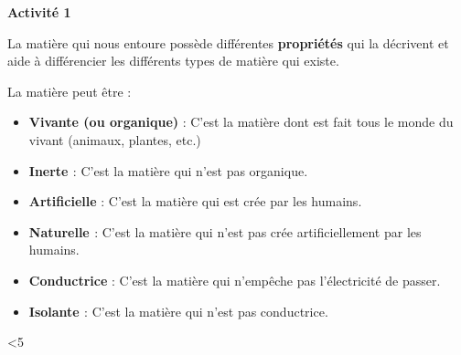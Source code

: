 \documentclass[10pt]{article}
\newcommand{\titre}{Activité 1} %
\newcommand{\sep}{-4pt} %
\newcommand{\DoItNTimes}{5} %
\begin{document}
\thispagestyle{fancy}
\cfoot{}


\setcounter{int}{1}
\loop

\begin{mybox}{\textbf{\titre}}    
    \setlength\parindent{4pt} %
    \setlength\parskip{5pt} 

	La matière qui nous entoure possède différentes \textbf{\color{DarkRed} {propriétés}} 
    qui la décrivent et aide à différencier les différents types de matière qui existe.

    La matière peut être : 
    \begin{itemize}
        \item \textbf{\color{DarkRed} {Vivante (ou organique)}} : 
        C'est la matière dont est fait tous le monde du vivant
        (animaux, plantes, etc.)
        \item \textbf{\color{DarkRed} {Inerte }} :
        C'est la matière qui n'est pas organique.
        \item \textbf{\color{DarkRed} {Artificielle}} : 
        C'est la matière qui est crée par les humains.
        \item \textbf{\color{DarkRed} {Naturelle }} :
        C'est la matière qui n'est pas crée artificiellement par les humains.
        \item \textbf{\color{DarkRed} {Conductrice}} :
        C'est la matière qui n'empêche pas l'électricité de passer.
        \item \textbf{\color{DarkRed} {Isolante }} :
        C'est la matière qui n'est pas conductrice.
    \end{itemize}


\end{mybox}

\vspace{\sep}

\addtocounter{int}{1}
\ifnum\value{int}<\DoItNTimes\repeat
\end{document}
